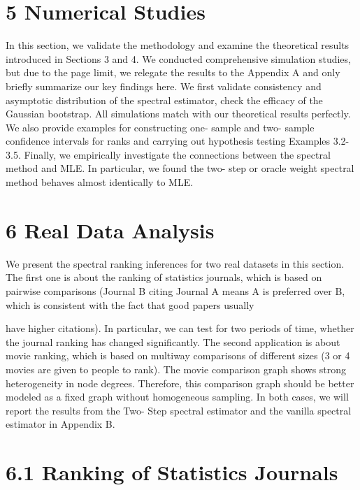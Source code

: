 

\section{5 Numerical Studies}\label{numerical-studies}

In this section, we validate the methodology and examine the theoretical
results introduced in Sections 3 and 4. We conducted comprehensive
simulation studies, but due to the page limit, we relegate the results
to the Appendix A and only briefly summarize our key findings here. We
first validate consistency and asymptotic distribution of the spectral
estimator, check the efficacy of the Gaussian bootstrap. All simulations
match with our theoretical results perfectly. We also provide examples
for constructing one- sample and two- sample confidence intervals for
ranks and carrying out hypothesis testing Examples 3.2- 3.5. Finally, we
empirically investigate the connections between the spectral method and
MLE. In particular, we found the two- step or oracle weight spectral
method behaves almost identically to MLE.

\section{6 Real Data Analysis}\label{real-data-analysis}

We present the spectral ranking inferences for two real datasets in this
section. The first one is about the ranking of statistics journals,
which is based on pairwise comparisons (Journal B citing Journal A means
A is preferred over B, which is consistent with the fact that good
papers usually

have higher citations). In particular, we can test for two periods of
time, whether the journal ranking has changed significantly. The second
application is about movie ranking, which is based on multiway
comparisons of different sizes (3 or 4 movies are given to people to
rank). The movie comparison graph shows strong heterogeneity in node
degrees. Therefore, this comparison graph should be better modeled as a
fixed graph without homogeneous sampling. In both cases, we will report
the results from the Two- Step spectral estimator and the vanilla
spectral estimator in Appendix B.

\section{6.1 Ranking of Statistics
Journals}\label{ranking-of-statistics-journals}

